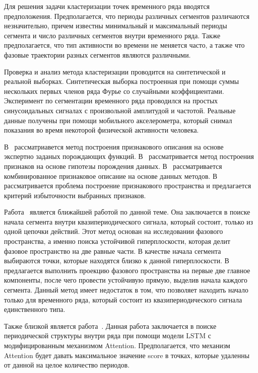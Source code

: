 Для решения задачи кластеризации точек временного ряда вводятся предположения. 
Предполагается, что периоды различных сегментов различаются незначительно, причем известны минимальный и максимальный периоды сегмента и число различных сегментов внутри временного ряда. 
Также предполагается, что тип активности во времени не меняется часто, а также что фазовые траектории разных сегментов являются различными. 

Проверка и анализ метода кластеризации проводится на синтетической и реальной выборках. 
Синтетическая выборка построенная при помощи суммы нескольких первых членов ряда Фурье со случайными коэффициентами. 
Эксперимент по сегментации временного ряда проводился на простых синусоидальных сигналах с произвольной амплитудой и частотой. 
Реальные данные получены при помощи мобильного акселерометра, который снимал показания во время некоторой физической активности человека. 

В~\cite{kwapisz2010} рассматриавется метод построения признакового описания на основе экспертно заданых порождающих функций.
В~\cite{lukashin2003} рассматривается метод построения признаков на основе гипотезы порождения данных. 
В~\cite{Ivkin2015} рассматривается комбинированное признаковое описание на основе данных методов. 
В~\cite{Katrutsa2015} рассматривается проблема построение признакового пространства и предлагается критерий избыточности выбранных признаков.

Работа~\cite{motrenko2015} является ближайшей работой по данной теме. Она заключается в поиске начала сегмента внутри квазипериодического сигнала, который состоит, только из одной цепочки действий. Этот метод основан на исследовании фазового пространства, а именно поиска устойчивой гиперплоскости, которая делит фазовое пространство на две равные части. В качестве начала сегмента выбираются точки, которые находятся близко к данной гиперплоскости. В~\cite{motrenko2015} предлагается выполнить проекцию фазового пространства на первые две главное компоненты, после чего провести устойчивую прямую, выделив начала каждого сегмента. 
Данный метод имеет недостаток в том, что позволяет находить начало только для временного ряда, который состоит из квазипериодического сигнала единственного типа.


Также близкой является работа~\cite{cinar2018}.  Данная работа заключается в поиске периодической структуры внутри ряда при помощи модели LSTM с модифицированным механизмом Attention. Предполагается, что механизм Attention будет давать максимальное значение score в точках, которые удаленны от данной на целое количество периодов.

